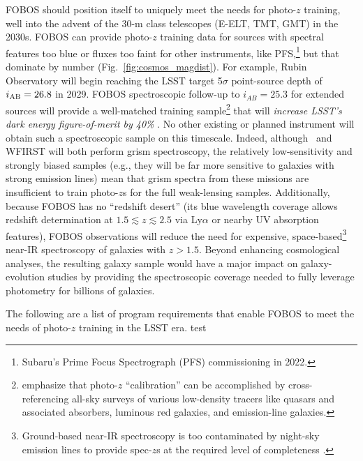 \documentclass[11pt,a4paper,twoside,onecolumn,openany,final,oldfontcommands]{memoir}
\begin{document}
FOBOS should position itself to uniquely meet the needs for photo-$z$ training, well into the advent of the 30-m class telescopes (E-ELT, TMT, GMT) in the 2030s.  FOBOS can provide photo-$z$ training data for sources with spectral features too blue or fluxes too faint for other instruments, like PFS,\footnote{Subaru's Prime Focus Spectrograph (PFS) commissioning in 2022.} but that dominate by number (Fig.~\ref{fig:cosmos_magdist}).  For example, Rubin Observatory will begin reaching the LSST target 5$\sigma$ point-source depth of $i_{\rm AB} = 26.8$ in 2029.   FOBOS spectroscopic follow-up to $i_{AB} = 25.3$ for extended sources will provide a well-matched training sample\footnote{\citet{newman15} emphasize that photo-$z$ ``calibration'' can be accomplished by cross-referencing all-sky surveys of various low-density tracers like quasars and associated absorbers, luminous red galaxies, and emission-line galaxies.} that will \textit{increase LSST's dark energy figure-of-merit by 40\%} \citep{newman15}. No other existing or planned instrument will obtain such a spectroscopic sample on this timescale.  Indeed, although \euclid\ and WFIRST will both perform grism spectroscopy, the relatively low-sensitivity and strongly biased samples (e.g., they will be far more sensitive to galaxies with strong emission lines) mean that grism spectra from these missions are insufficient to train photo-$z$s for the full weak-lensing samples.  Additionally, because FOBOS has no ``redshift desert'' (its blue wavelength coverage allows redshift determination at $1.5\lesssim z \lesssim2.5$ via Ly$\alpha$ or nearby UV absorption features), FOBOS observations will reduce the need for expensive, space-based\footnote{Ground-based near-IR spectroscopy is too contaminated by night-sky emission lines to provide spec-$z$s at the required level of completeness \citep{newman15}.} near-IR spectroscopy of galaxies with $z > 1.5$.  Beyond enhancing cosmological analyses, the resulting galaxy sample would have a major impact on galaxy-evolution studies by providing the spectroscopic coverage needed to fully leverage photometry for billions of galaxies. %

The following are a list of program requirements that enable FOBOS to meet the needs of photo-$z$ training in the LSST era.   test
\end{document}
